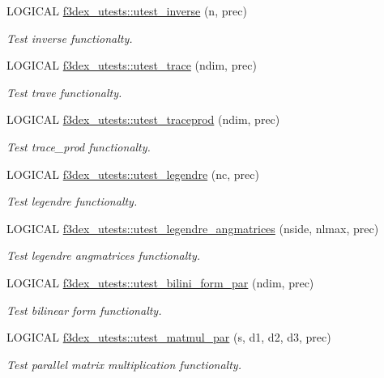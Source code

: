 \begin{DoxyCompactItemize}
\item 
LOGICAL \hyperlink{namespacef3dex__utests_a1ac11b22f78f0d83a22ab998cc2e1112}{f3dex\_\-utests::utest\_\-inverse} (n, prec)
\begin{DoxyCompactList}\small\item\em Test inverse functionalty. \end{DoxyCompactList}\item 
LOGICAL \hyperlink{namespacef3dex__utests_a9afe88e0ae4f7e4e96f5f6c4516310d9}{f3dex\_\-utests::utest\_\-trace} (ndim, prec)
\begin{DoxyCompactList}\small\item\em Test trave functionalty. \end{DoxyCompactList}\item 
LOGICAL \hyperlink{namespacef3dex__utests_aaa91fc8ed84fd3255d97e9b51f2cb970}{f3dex\_\-utests::utest\_\-traceprod} (ndim, prec)
\begin{DoxyCompactList}\small\item\em Test trace\_\-prod functionalty. \end{DoxyCompactList}\item 
LOGICAL \hyperlink{namespacef3dex__utests_a0bd9e3f3f7857cd59dd4787f27053ed2}{f3dex\_\-utests::utest\_\-legendre} (nc, prec)
\begin{DoxyCompactList}\small\item\em Test legendre functionalty. \end{DoxyCompactList}\item 
LOGICAL \hyperlink{namespacef3dex__utests_a57da44b855f549d74b66e6f5766ad969}{f3dex\_\-utests::utest\_\-legendre\_\-angmatrices} (nside, nlmax, prec)
\begin{DoxyCompactList}\small\item\em Test legendre angmatrices functionalty. \end{DoxyCompactList}\item 
LOGICAL \hyperlink{namespacef3dex__utests_a711e4fe7b4894dfb823cfaede48d377d}{f3dex\_\-utests::utest\_\-bilini\_\-form\_\-par} (ndim, prec)
\begin{DoxyCompactList}\small\item\em Test bilinear form functionalty. \end{DoxyCompactList}\item 
LOGICAL \hyperlink{namespacef3dex__utests_af92f9fe6f9ec9dade31e9fc47ea73551}{f3dex\_\-utests::utest\_\-matmul\_\-par} (s, d1, d2, d3, prec)
\begin{DoxyCompactList}\small\item\em Test parallel matrix multiplication functionalty. \end{DoxyCompactList}\end{DoxyCompactItemize}

